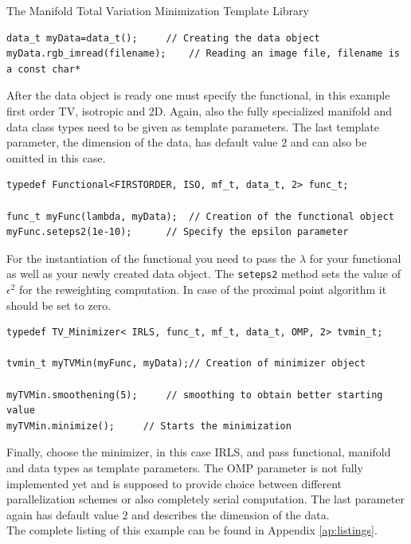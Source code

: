 \begin{chapter}{The Manifold Total Variation Minimization Template Library}
\cppinline
\begin{lstlisting}[label=code:tut_data,caption={Initialization and input of image data}]
data_t myData=data_t();		// Creating the data object
myData.rgb_imread(filename);	// Reading an image file, filename is a const char*
\end{lstlisting}

After the data object is ready one must specify the functional, in this example first order TV, isotropic and 2D. Again,
also the fully specialized manifold and data class types need to be given as template parameters. The last template parameter, the dimension of the data, 
has default value $2$ and can also be omitted in this case.\\

\cppinline
\begin{lstlisting}[label=code:tut_func,caption={Defining the functional and setting parameters}]
typedef Functional<FIRSTORDER, ISO, mf_t, data_t, 2> func_t;

func_t myFunc(lambda, myData);  // Creation of the functional object
myFunc.seteps2(1e-10);		// Specify the epsilon parameter 
\end{lstlisting}

For the instantiation of the functional you need to pass the $\lambda$ for your functional as well as your newly created data object. The \texttt{seteps2} method
sets the value of $\epsilon^2$ for the reweighting computation. In case of the proximal point algorithm it should be set to zero.\\

\cppinline
\begin{lstlisting}[label=code:tut_data,caption={Choosing the minimizer, smoothing and minimization}]
typedef TV_Minimizer< IRLS, func_t, mf_t, data_t, OMP, 2> tvmin_t;

tvmin_t myTVMin(myFunc, myData);// Creation of minimizer object

myTVMin.smoothening(5);		// smoothing to obtain better starting value
myTVMin.minimize();		// Starts the minimization
\end{lstlisting}

Finally, choose the minimizer, in this case IRLS, and pass functional, manifold and data types as template parameters. The OMP parameter is not fully implemented yet 
and is supposed to provide choice between different parallelization schemes or also completely serial computation. The last parameter again has default value $2$ and describes the 
dimension of the data.\\
The complete listing of this example can be found in Appendix \ref{ap:listings}.


\end{chapter}
